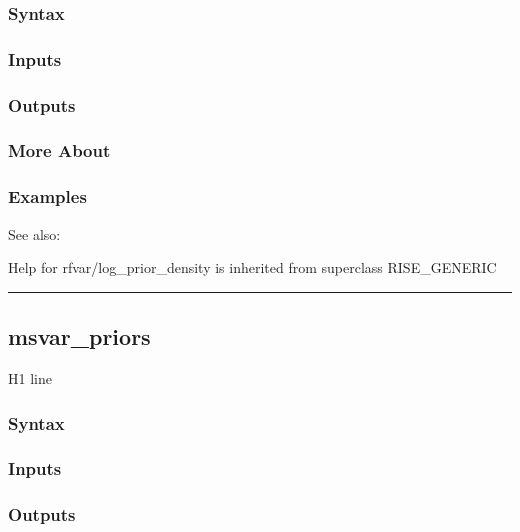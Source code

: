 \documentclass[letterpaper,10pt,english]{sphinxmanual}
\begin{document}
\subsubsection{Syntax}
\label{classes/models/@rfvar/rfvar:id65}

\subsubsection{Inputs}
\label{classes/models/@rfvar/rfvar:id66}

\subsubsection{Outputs}
\label{classes/models/@rfvar/rfvar:id67}

\subsubsection{More About}
\label{classes/models/@rfvar/rfvar:id68}

\subsubsection{Examples}
\label{classes/models/@rfvar/rfvar:id69}
See also:

Help for rfvar/log\_prior\_density is inherited from superclass RISE\_GENERIC


\bigskip\hrule{}\bigskip



\subsection{msvar\_priors}
\label{classes/models/@rfvar/rfvar:id70}\label{classes/models/@rfvar/rfvar:msvar-priors}
H1 line


\subsubsection{Syntax}
\label{classes/models/@rfvar/rfvar:id71}

\subsubsection{Inputs}
\label{classes/models/@rfvar/rfvar:id72}

\subsubsection{Outputs}
\label{classes/models/@rfvar/rfvar:id73}
\end{document}
